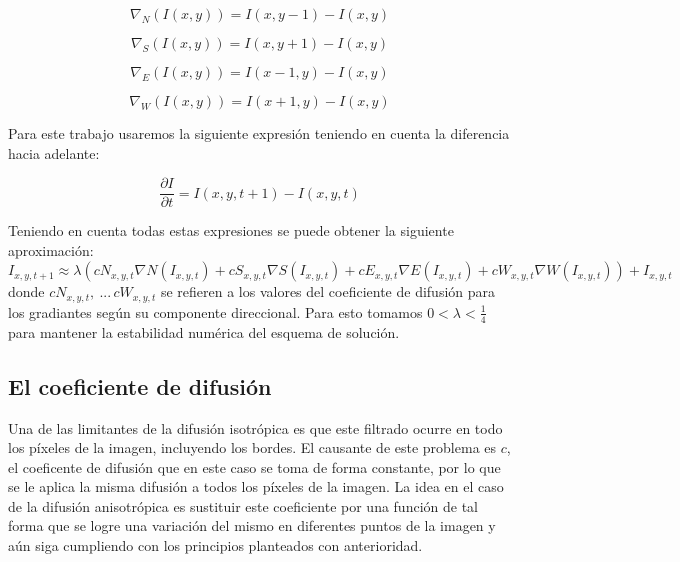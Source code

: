 \documentclass[a4paper,10pt,twocolumn]{article}
\begin{document}
\begin{equation}
	\nabla_N(I(x,y)) = I(x,y-1) - I(x,y)	
\end{equation}

\begin{equation}
	\nabla_S(I(x,y)) = I(x,y+1) - I(x,y)	
\end{equation}

\begin{equation}
	\nabla_E(I(x,y)) = I(x-1,y) - I(x,y)	
\end{equation}

\begin{equation}
	\nabla_W(I(x,y)) = I(x+1,y) - I(x,y)	
\end{equation}

Para este trabajo usaremos la siguiente expresi\'on teniendo en cuenta la diferencia hacia adelante:

\begin{equation}
	\frac{\partial I}{\partial t} = I(x, y, t+1) - I(x,y,t)
\end{equation}

Teniendo en cuenta todas estas expresiones se puede obtener la siguiente aproximaci\'on: \\

$I_{x,y,t+1} \approx \lambda (cN_{x,y,t} \nabla N(I_{x,y,t}) + cS_{x,y,t} \nabla S(I_{x,y,t}) + cE_{x,y,t} \nabla E(I_{x,y,t}) + cW_{x,y,t} \nabla W(I_{x,y,t})) + I_{x,y,t}$ \\

donde $cN_{x,y,t},\ ... \, cW_{x,y,t}$ se refieren a los valores del coeficiente de difusi\'on para los gradiantes seg\'un su componente direccional. Para esto tomamos $0 < \lambda < \frac{1}{4}$ para mantener la estabilidad num\'erica del esquema de soluci\'on.

\subsection{El coeficiente de difusi\'on}\label{sec:coeficiente_difusion}
		
Una de las limitantes de la difusi\'on isotr\'opica es que este filtrado ocurre en todo los p\'ixeles de la imagen, incluyendo los bordes. El causante de este problema es $c$, el coeficente de difusi\'on que en este caso se toma de forma constante, por lo que se le aplica la misma difusi\'on a todos los p\'ixeles de la imagen. La idea en el caso de la difusi\'on anisotr\'opica es sustituir este coeficiente por una funci\'on de tal forma que se logre una variaci\'on del mismo en diferentes puntos de la imagen y a\'un siga cumpliendo con los principios planteados con anterioridad.
\end{document}
